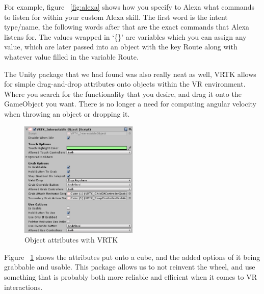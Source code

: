 \documentclass[onecolumn, draftclsnofoot,10pt, compsoc]{IEEEtran}
\begin{document}
    For example, figure ~\ref{fig:alexa} shows how you specify to Alexa what commands to listen for within your custom Alexa skill. The first word is the intent type/name, the following words after that are the exact commands that Alexa listens for. The values wrapped in {‘}\{\}{’} are variables which you can assign any value, which are later passed into an object with the key Route along with whatever value filled in the variable Route. 
    
    The Unity package that we had found was also really neat as well, VRTK allows for simple drag-and-drop attributes onto objects within the VR environment. Where you search for the functionality that you desire, and drag it onto the GameObject you want. There is no longer a need for computing angular velocity when throwing an object or dropping it. 

    \begin{figure}
        \centering
        \includegraphics[width=0.5\textwidth]{VRTK.eps}
        \caption{Object attributes with VRTK}
        \label{fig:vrtk}
    \end{figure}

    Figure ~\ref{fig:vrtk} shows the attributes put onto a cube, and the added options of it being grabbable and usable. This package allows us to not reinvent the wheel, and use something that is probably both more reliable and efficient when it comes to VR interactions.
\end{document}
